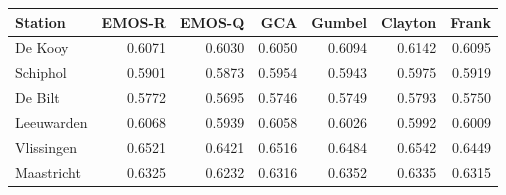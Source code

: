 \begin{table}[ht]
\centering
\begin{tabular}{lrrrrrr}
  \hline
Station & EMOS-R & EMOS-Q & GCA & Gumbel & Clayton & Frank \\ 
  \hline
De Kooy & 0.6071 & 0.6030 & 0.6050 & 0.6094 & 0.6142 & 0.6095 \\ 
  Schiphol & 0.5901 & 0.5873 & 0.5954 & 0.5943 & 0.5975 & 0.5919 \\ 
  De Bilt & 0.5772 & 0.5695 & 0.5746 & 0.5749 & 0.5793 & 0.5750 \\ 
  Leeuwarden & 0.6068 & 0.5939 & 0.6058 & 0.6026 & 0.5992 & 0.6009 \\ 
  Vlissingen & 0.6521 & 0.6421 & 0.6516 & 0.6484 & 0.6542 & 0.6449 \\ 
  Maastricht & 0.6325 & 0.6232 & 0.6316 & 0.6352 & 0.6335 & 0.6315 \\ 
   \hline
\end{tabular}
\end{table}
